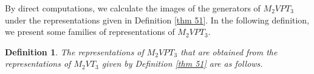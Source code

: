 \documentclass[preprint]{elsarticle}
\newtheorem{definition}[theorem]{Definition}
\begin{document}
By direct computations, we calculate the images of the generators of $M_2VPT_3$ under the representations given in Definition  \ref{thm 51}. In the following definition, we present some families of representations of $M_2VPT_3$.

\begin{definition}
 The representations of $M_2VPT_3$ that are obtained from the representations of $M_2VT_3$ given by Definition \ref{thm 51} are as follows.
\end{definition}
\end{document}
